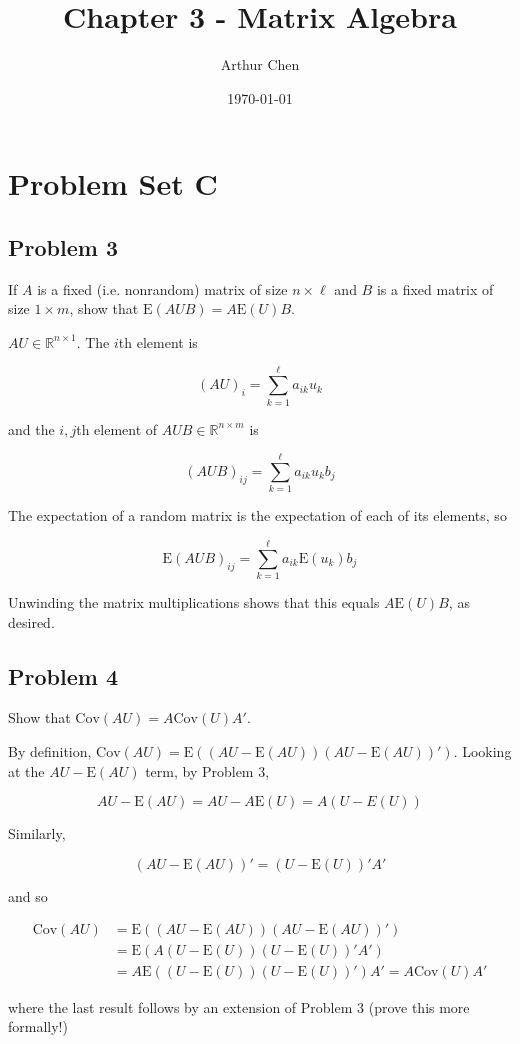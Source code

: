 \documentclass{article}
\author{Arthur Chen}
\title{Chapter 3 - Matrix Algebra}
\date{\today}
\newcommand{\R}{\mathbb{R}}
\newcommand{\E}{\text{E}}
\newcommand{\cov}{\text{Cov}}
\begin{document}
\maketitle

\section*{Problem Set C}

\subsection*{Problem 3}

If $A$ is a fixed (i.e. nonrandom) matrix of size $n \times \ell$ and $B$ is a fixed matrix of size $1 \times m$, show that $\E(AUB) = A\E(U)B$.

$AU \in \R^{n \times 1}$. The $i$th element is

\[
(AU)_i = \sum_{k=1}^\ell a_{ik}u_k
\]

and the $i,j$th element of $AUB \in \R^{n \times m}$ is

\[
(AUB)_{ij} = \sum_{k=1}^\ell a_{ik}u_k b_j
\]

The expectation of a random matrix is the expectation of each of its elements, so

\[
\E(AUB)_{ij} = \sum_{k=1}^\ell a_{ik} \E(u_k) b_j
\]

Unwinding the matrix multiplications shows that this equals $A\E(U)B$, as desired.

\subsection*{Problem 4}

Show that $\cov(AU) = A\cov(U)A'$.

By definition, $\cov(AU) = \E\left((AU-\E(AU))(AU-\E(AU))'\right)$. Looking at the $AU-\E(AU)$ term, by Problem 3,

\[
AU-\E(AU) = AU - A\E(U) = A(U-E(U))
\]

Similarly,

\[
(AU-\E(AU))' = (U-\E(U))'A'
\]

and so

\begin{align*}
\cov(AU) &= \E\left((AU-\E(AU))(AU-\E(AU))'\right)  \\
&= \E\left( A(U - \E(U))(U - \E(U))' A' \right) \\
&= A \E\left((U - \E(U))(U - \E(U))'  \right) A'
= A \cov(U) A'
\end{align*}

where the last result follows by an extension of Problem 3 (prove this more formally!)
\end{document}
